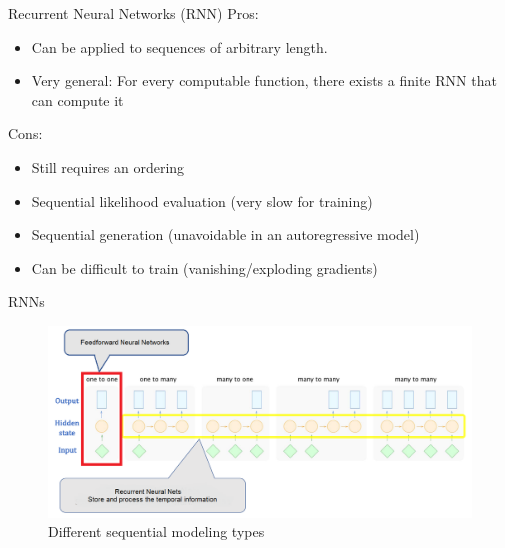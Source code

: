 \begin{frame}[allowframebreaks]{Recurrent Neural Networks (RNN)}
\framebreak
Pros:
\begin{itemize}
    \item Can be applied to sequences of arbitrary length.
    \item Very general: For every computable function, there exists a finite RNN that can compute it
\end{itemize}
\vskip 10pt
Cons:
\begin{itemize}
    \item Still requires an ordering
    \item Sequential likelihood evaluation (very slow for training)
    \item Sequential generation (unavoidable in an autoregressive model)
    \item Can be difficult to train (vanishing/exploding gradients)
\end{itemize}
\end{frame}

\begin{frame}{RNNs}

\framebreak
\begin{figure}
    \centering
    \includegraphics[height=0.9\textheight, width=\textwidth, keepaspectratio]{images/autoregressive/rnn_types.png}
    \caption*{Different sequential modeling types}
\end{figure}
    
\end{frame}

